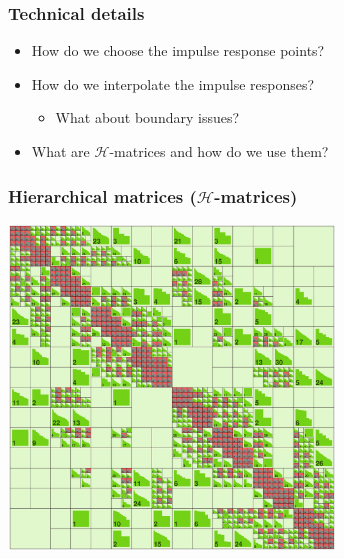 \documentclass[10pt,final,xcolor=dvipsnames]{beamer}
\begin{document}
\begin{frame}
	\frametitle{Technical details}
	{\Large
		\begin{itemize}
			\setlength\itemsep{2em}
			\item How do we choose the impulse response points?
			\item How do we interpolate the impulse responses? 
			\begin{itemize}
				\item {\large What about boundary issues?}
			\end{itemize}
			\item What are $\mathcal{H}$-matrices and how do we use them?
		\end{itemize}
	}
\end{frame}

\begin{frame}
	\frametitle{Hierarchical matrices ($\mathcal{H}$-matrices)}
	\begin{center}
		\includegraphics[width=0.65\textwidth]{heat_inverse_problem_Hfull_hmatrix.eps}
	\end{center}
\end{frame}
\end{document}
